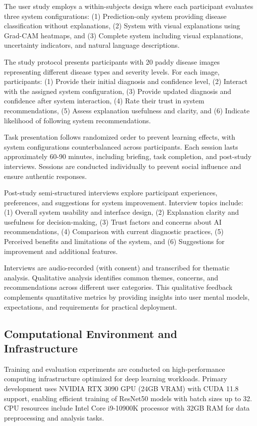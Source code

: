 \documentclass[agriculture,article,submit,pdftex,moreauthors]{Definitions/mdpi}
\begin{document}
The user study employs a within-subjects design where each participant evaluates three system configurations: (1) Prediction-only system providing disease classification without explanations, (2) System with visual explanations using Grad-CAM heatmaps, and (3) Complete system including visual explanations, uncertainty indicators, and natural language descriptions.

The study protocol presents participants with 20 paddy disease images representing different disease types and severity levels. For each image, participants: (1) Provide their initial diagnosis and confidence level, (2) Interact with the assigned system configuration, (3) Provide updated diagnosis and confidence after system interaction, (4) Rate their trust in system recommendations, (5) Assess explanation usefulness and clarity, and (6) Indicate likelihood of following system recommendations.

Task presentation follows randomized order to prevent learning effects, with system configurations counterbalanced across participants. Each session lasts approximately 60-90 minutes, including briefing, task completion, and post-study interviews. Sessions are conducted individually to prevent social influence and ensure authentic responses.


Post-study semi-structured interviews explore participant experiences, preferences, and suggestions for system improvement. Interview topics include: (1) Overall system usability and interface design, (2) Explanation clarity and usefulness for decision-making, (3) Trust factors and concerns about AI recommendations, (4) Comparison with current diagnostic practices, (5) Perceived benefits and limitations of the system, and (6) Suggestions for improvement and additional features.

Interviews are audio-recorded (with consent) and transcribed for thematic analysis. Qualitative analysis identifies common themes, concerns, and recommendations across different user categories. This qualitative feedback complements quantitative metrics by providing insights into user mental models, expectations, and requirements for practical deployment.

\subsection{Computational Environment and Infrastructure}

Training and evaluation experiments are conducted on high-performance computing infrastructure optimized for deep learning workloads. Primary development uses NVIDIA RTX 3090 GPU (24GB VRAM) with CUDA 11.8 support, enabling efficient training of ResNet50 models with batch sizes up to 32. CPU resources include Intel Core i9-10900K processor with 32GB RAM for data preprocessing and analysis tasks.
\end{document}
